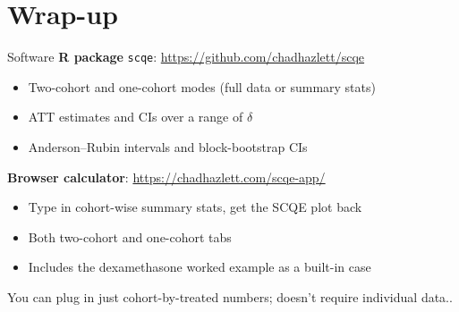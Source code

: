 \documentclass[handout,xcolor=dvipsnames,pdftex,hyperref={colorlinks=false}]{beamer}
\newcommand\makegaps{\addtolength{\itemsep}{.25\baselineskip}}
\begin{document}

\section{Wrap-up}

\begin{frame}{Software}
 \textbf{R package} \texttt{scqe}: \url{https://github.com/chadhazlett/scqe}\\
\small
\begin{itemize}
\item Two-cohort and one-cohort modes (full data or summary stats)
\item ATT estimates and CIs over a range of $\delta$
\item Anderson--Rubin intervals and block-bootstrap CIs
\end{itemize}
\bigskip
\normalsize
{} \textbf{Browser calculator}: \url{https://chadhazlett.com/scqe-app/}\\
\small
\begin{itemize}
\item Type in cohort-wise summary stats, get the SCQE plot back
\item Both two-cohort and one-cohort tabs
\item Includes the dexamethasone worked example as a built-in case
\end{itemize}
\bigskip
\normalsize
{} You can plug in just cohort-by-treated numbers; doesn't require individual data.. 
\end{frame}
\end{document}
